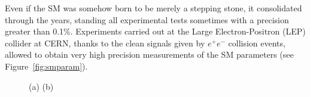 Even if the SM was somehow born to be merely a stepping stone, 
it consolidated through the years, standing all experimental tests 
sometimes with a precision greater than 0.1\%. Experiments carried 
out at the Large Electron-Positron (LEP) collider at CERN, 
thanks to the clean signals given by $e^{+}e^{-}$ collision events, 
allowed to obtain very high precision measurements of the SM parameters
(see Figure~\ref{fig:smparam}). %
\begin{figure}[htb]\begin{center}
        \caption[bla]{(a) 
        (b) }
\end{center}\end{figure}
 
